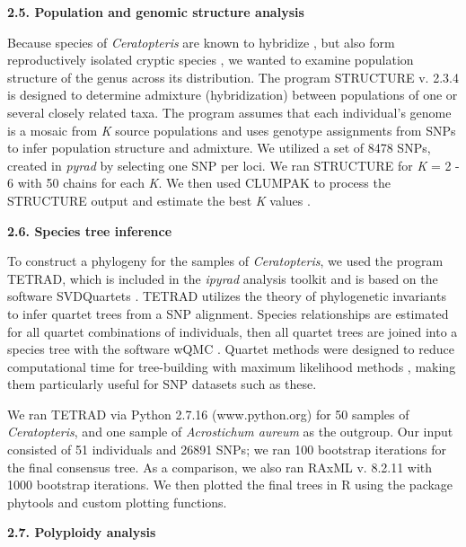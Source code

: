 \documentclass[12pt]{article}
\begin{document}
\begin{flushleft}
\textbf{2.5. Population and genomic structure analysis}

Because species of \textit{Ceratopteris} are known to hybridize \autocite{hickok1974}, but also form reproductively isolated cryptic species \autocite{Masuyama2002}, we wanted to examine population structure of the genus across its distribution. The program {\small{STRUCTURE}} v. 2.3.4 \autocite{Pritchard2000} is designed to determine admixture (hybridization) between populations of one or several closely related taxa. The program assumes that each individual's genome is a mosaic from \textit{K} source populations and uses genotype assignments from SNPs to infer population structure and admixture. We utilized a set of 8478 SNPs, created in \textit{pyrad} by selecting one SNP per loci. We ran {\small{STRUCTURE}} for \textit{K} = 2 - 6 with 50 chains for each \textit{K}. We then used {\small{CLUMPAK}} \autocite{Kopelman2015} to process the {\small{STRUCTURE}} output and estimate the best \textit{K} values \autocite{Evanno2005, Pritchard2000}.

\textbf{2.6. Species tree inference}

To construct a phylogeny for the samples of \textit{Ceratopteris}, we used the program {\small{TETRAD}}, which is included in the \textit{ipyrad} analysis toolkit and is based on the software \small{SVDQuartets} \autocite{Chifman2015}. {\small{TETRAD}} utilizes the theory of phylogenetic invariants to infer quartet trees from a SNP alignment. Species relationships are estimated for all quartet combinations of individuals, then all quartet trees are joined into a species tree with the software {\small{wQMC}} \autocite{Avni2015}. Quartet methods were designed to reduce computational time for tree-building with maximum likelihood methods \autocite{Ranwez2001}, making them particularly useful for SNP datasets such as these.

We ran {\small{TETRAD}} via Python 2.7.16 (www.python.org) for 50 samples of \textit{Ceratopteris}, and one sample of \textit{Acrostichum aureum} as the outgroup. Our input consisted of 51 individuals and 26891 SNPs; we ran 100 bootstrap iterations for the final consensus tree. As a comparison, we also ran {\small{RAxML}} v. 8.2.11 \autocite{Stamatakis2014} with 1000 bootstrap iterations. We then plotted the final trees in R using the package phytools \autocite{Revell2012} and custom plotting functions.

\textbf{2.7. Polyploidy analysis}


\end{flushleft}
\end{document}

